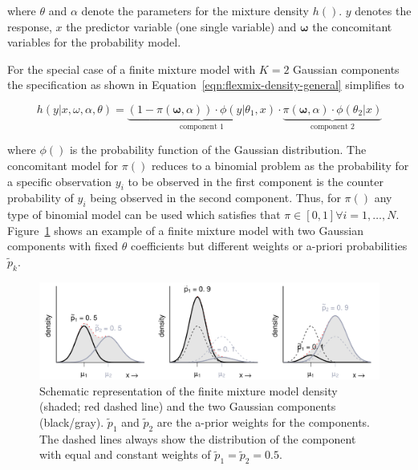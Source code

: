 \documentclass[article,nojss,shortnames]{jss}
\begin{document}
where $\mathit{\theta}$ and $\mathit{\alpha}$ denote the parameters for the
mixture density $h()$. $\mathit{y}$ denotes the response, $\mathit{x}$ the
predictor variable (one single variable) and $\mathbf{\omega}$ the concomitant
variables for the probability model.

For the special case of a finite mixture model with $K=2$ Gaussian components
the specification as shown in Equation~\ref{eqn:flexmix-density-general} simplifies to

\begin{equation}
    h(\mathit{y} | \mathit{x}, \mathit{\omega}, \mathit{\alpha}, \mathit{\theta}) =
        \underbrace{
            (1 - \mathit{\pi}(\mathbf{\omega}, \mathit{\alpha})) \cdot
            \phi(\mathit{y} | \mathit{\theta}_1, \mathit{x})
        }_{\text{component 1}}
        \cdot
        \underbrace{
            \mathit{\pi}(\mathbf{\omega}, \mathit{\alpha}) \cdot \phi(\mathit{\theta}_2|\mathit{x})
        }_{\text{component 2}}
    \label{eqn:flexmix-density-gaussian}
\end{equation}

where $\phi()$ is the probability function of the Gaussian distribution.
The concomitant model for $\pi()$ reduces to a binomial problem as the probability
for a specific observation $y_i$ to be observed in the first component is the
counter probability of $y_i$ being observed in the second component.
Thus, for $\pi()$ any type of binomial model can be used which satisfies
that $\pi \in [0,1] \forall i=1,\dots,N$.
Figure~\ref{fig:schematic_density} shows an example of a finite mixture model with
two Gaussian components with fixed $\mathit{\theta}$ coefficients but different
weights or a-priori probabilities $\tilde{p}_k$.


\begin{figure}[h]
    \centering
    \includegraphics[width = .8\textwidth]{draft_schematic_density}
    \caption{Schematic representation of the finite mixture model density
    (shaded; red dashed line) and the two Gaussian components (black/gray). 
    $\tilde{p}_1$ and $\tilde{p}_2$ are the a-prior weights for the components.
    The dashed lines always show the distribution of the component with equal
    and constant weights of $\tilde{p}_1 = \tilde{p}_2 = 0.5$.}
    \label{fig:schematic_density}
\end{figure}
\end{document}

